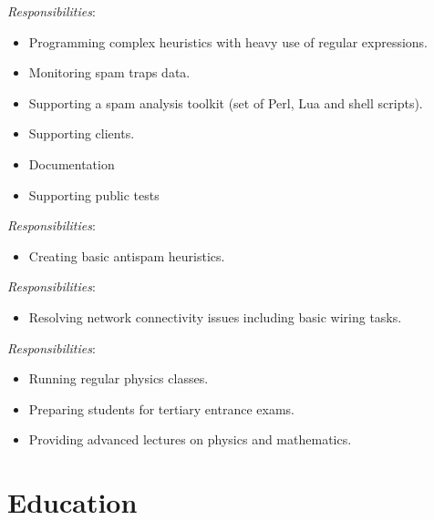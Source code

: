 \documentclass[11pt,a4paper,sans]{moderncv}        %
\newcommand{\responsibilities}[1]{ \emph{Responsibilities}:\begin{itemize} #1\end{itemize}}
\begin{document}
 {
    \responsibilities {
        \item Programming complex heuristics with heavy use of regular expressions.
        \item Monitoring spam traps data.
        \item Supporting a spam analysis toolkit (set of Perl, Lua and shell scripts).
        \item Supporting clients.
        \item Documentation
        \item Supporting public tests %
    }
}

 {
    \responsibilities {
        \item Creating basic antispam heuristics.
    }
}

 {
    \responsibilities {
        \item Resolving network connectivity issues including basic wiring tasks.
    }
}

 {
    \responsibilities {
        \item Running regular physics classes.
        \item Preparing students for tertiary entrance exams.
        \item Providing advanced lectures on physics and mathematics.
    }
}


\section{Education}
\end{document}
